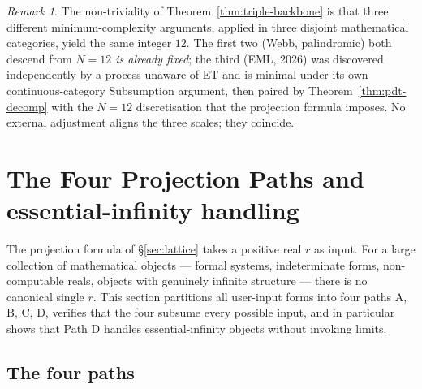 \documentclass[11pt,a4paper]{article}
\theoremstyle{definition}
\theoremstyle{remark}
\newtheorem{remark}[theorem]{Remark}
\begin{document}
\begin{remark}
The non-triviality of Theorem~\ref{thm:triple-backbone} is that three different minimum-complexity arguments, applied in three disjoint mathematical categories, yield the same integer $12$. The first two (Webb, palindromic) both descend from \emph{$N=12$ is already fixed}; the third (EML, 2026) was discovered independently by a process unaware of ET and is minimal under its own continuous-category Subsumption argument, then paired by Theorem~\ref{thm:pdt-decomp} with the $N=12$ discretisation that the projection formula imposes. No external adjustment aligns the three scales; they coincide.
\end{remark}

\section{The Four Projection Paths and essential-infinity handling}\label{sec:paths}

The projection formula of \S\ref{sec:lattice} takes a positive real $r$ as input. For a large collection of mathematical objects --- formal systems, indeterminate forms, non-computable reals, objects with genuinely infinite structure --- there is no canonical single $r$. This section partitions all user-input forms into four paths A, B, C, D, verifies that the four subsume every possible input, and in particular shows that Path D handles essential-infinity objects without invoking limits.

\subsection{The four paths}
\end{document}

